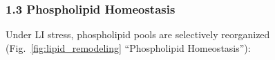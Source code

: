 \documentclass[10pt,letterpaper]{article}
\begin{document}



\subsubsection*{1.3 Phospholipid Homeostasis}

Under LI stress, phospholipid pools are selectively reorganized (Fig.~\ref{fig:lipid_remodeling} “Phospholipid Homeostasis”):
\end{document}
